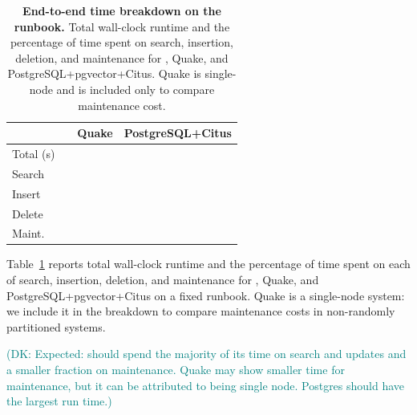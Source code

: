 \documentclass[sigconf,review,anonymous]{acmart}
\newcommand{\dk}[1]{\textcolor{teal}{(DK: #1)}}
\begin{document}
\begin{table}
    \centering

    \caption{\textbf{End-to-end time breakdown on the \TODO{} runbook.} Total wall-clock runtime and the percentage of time spent on search, insertion, deletion, and maintenance for \SystemName{}, Quake, and PostgreSQL+pgvector+Citus. Quake is single-node and is included only to compare maintenance cost. }

    \label{tab:time-breakdown}
    \begin{tabular}{lrrr}
        \toprule
        & \SystemName{} & Quake & PostgreSQL+Citus \\
        \midrule
        Total (s) & \TODO{} & \TODO{} & \TODO{} \\
        Search    & \TODO{} & \TODO{} & \TODO{} \\
        Insert    & \TODO{} & \TODO{} & \TODO{} \\
        Delete    & \TODO{} & \TODO{} & \TODO{} \\
        Maint.    & \TODO{} & \TODO{} & \TODO{} \\
        \bottomrule
    \end{tabular}
\end{table}


Table~\ref{tab:time-breakdown} reports total wall-clock runtime and the percentage of time spent on each of search, insertion, deletion, and maintenance for \SystemName{}, Quake, and PostgreSQL+pgvector+Citus on a fixed runbook. Quake is a single-node system: we include it in the breakdown to compare maintenance costs in non-randomly partitioned systems.

\dk{Expected: \SystemName{} should spend the majority of its time on search and updates and a smaller fraction on maintenance. Quake may show smaller time for maintenance, but it can be attributed to being single node. Postgres should have the largest run time.}

\end{document}

